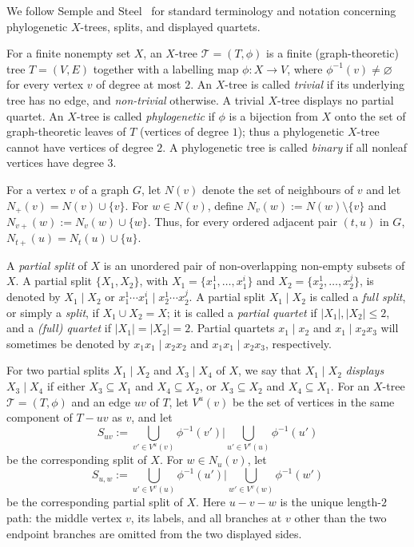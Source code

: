 \documentclass[12pt]{article}
\begin{document}
We follow Semple and Steel~\cite{SempleSteel2003} for standard terminology and
notation concerning phylogenetic $X$-trees, splits, and displayed quartets.

For a finite nonempty set $X$, an $X$-tree $\mathcal T=(T,\phi)$ is a finite
(graph-theoretic) tree $T=(V,E)$ together with a labelling map
$\phi:X\to V$, where $\phi^{-1}(v)\ne\varnothing$ for every vertex $v$
of degree at most $2$.  An $X$-tree is called \emph{trivial} if its underlying
tree has no edge, and \emph{non-trivial} otherwise.  A trivial $X$-tree
displays no partial quartet.  An $X$-tree is called \emph{phylogenetic} if
$\phi$ is a bijection from $X$ onto the set of graph-theoretic leaves of
$T$ (vertices of degree $1$); thus a phylogenetic
$X$-tree cannot have vertices of degree $2$.  A phylogenetic tree is
called \emph{binary} if all nonleaf vertices have degree $3$.

For a vertex $v$ of a graph $G$, let $N(v)$ denote the set of neighbours
of $v$ and let $N_+(v)=N(v)\cup\{v\}$.  For $w\in N(v)$, define
$N_v(w):=N(w)\setminus\{v\}$ and $N_{v+}(w):=N_v(w)\cup\{w\}$.
Thus, for every ordered adjacent pair $(t,u)$ in $G$,
$N_{t+}(u)=N_t(u)\cup\{u\}$.

A \emph{partial split} of $X$ is an unordered pair of non-overlapping
non-empty subsets of $X$.  A partial split $\{X_1,X_2\}$, with
$X_1=\{x_1^1,\ldots,x_1^i\}$ and
$X_2=\{x_2^1,\ldots,x_2^j\}$, is denoted by $X_1\mid X_2$ or
$x_1^1\cdots x_1^i\mid x_2^1\cdots x_2^j$.  A partial split
$X_1\mid X_2$ is called a \emph{full split}, or simply a \emph{split},
if $X_1\cup X_2=X$; it is called a \emph{partial quartet} if
$|X_1|,|X_2|\le2$, and a \emph{(full) quartet} if
$|X_1|=|X_2|=2$.  Partial quartets $x_1\mid x_2$ and
$x_1\mid x_2x_3$ will sometimes be denoted by
$x_1x_1\mid x_2x_2$ and $x_1x_1\mid x_2x_3$, respectively.

For two partial splits $X_1\mid X_2$ and $X_3\mid X_4$ of $X$, we say
that $X_1\mid X_2$ \emph{displays} $X_3\mid X_4$ if either
$X_3\subseteq X_1$ and $X_4\subseteq X_2$, or $X_3\subseteq X_2$ and
$X_4\subseteq X_1$.  For an $X$-tree $\mathcal T=(T,\phi)$ and an edge
$uv$ of $T$, let $V^u(v)$ be the set of vertices in the same component
of $T-uv$ as $v$, and let
\begin{equation}\label{eq:edge-split-definition}
 S_{uv}:=\bigcup_{v'\in V^u(v)}\phi^{-1}(v')
 \mathbin{\Big|}
 \bigcup_{u'\in V^v(u)}\phi^{-1}(u')
\end{equation}
be the corresponding split of $X$.  For $w\in N_u(v)$, let
\begin{equation}\label{eq:path-split-definition}
 S_{u,w}:=\bigcup_{u'\in V^v(u)}\phi^{-1}(u')
 \mathbin{\Big|}
\bigcup_{w'\in V^v(w)}\phi^{-1}(w')
\end{equation}
be the corresponding partial split of $X$.
Here $u-v-w$ is the unique length-$2$ path: the middle vertex $v$, its
labels, and all branches at $v$ other than the two endpoint branches are
omitted from the two displayed sides.
\end{document}
